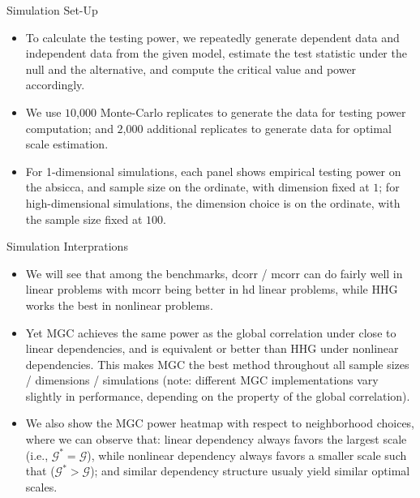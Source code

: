 \documentclass{beamer}
\newcommand{\G}{\mathcal{G}}
\begin{document}
\begin{frame}{Simulation Set-Up}
\begin{itemize}[<+->]
\item To calculate the testing power, we repeatedly generate dependent data and independent data from the given model, estimate the test statistic under the null and the alternative, and compute the critical value and power accordingly.
\item We use $10$,$000$ Monte-Carlo replicates to generate the data for testing power computation; and $2$,$000$ additional replicates to generate data for optimal scale estimation.
\item For 1-dimensional simulations, each panel shows empirical testing power on the absicca, and sample size on the ordinate, with dimension fixed at $1$; for high-dimensional simulations, the dimension choice is on the ordinate, with the sample size fixed at $100$.
\end{itemize}
\end{frame}

\begin{frame}{Simulation Interprations}
\begin{itemize}[<+->]
\item We will see that among the benchmarks, dcorr / mcorr can do fairly well in linear problems with mcorr being better in hd linear problems, while HHG works the best in nonlinear problems.
\item Yet MGC achieves the same power as the global correlation under close to linear dependencies, and is equivalent or better than HHG under nonlinear dependencies. This makes MGC the best method throughout all sample sizes / dimensions / simulations (note: different MGC implementations vary slightly in performance, depending on the property of the global correlation).
\item We also show the MGC power heatmap with respect to neighborhood choices, where we can observe that: linear dependency always favors the largest scale (i.e., $\G^{*}=\G$), while nonlinear dependency always favors a smaller scale such that ($\G^{*}>\G$); and similar dependency structure usualy yield similar optimal scales.
\end{itemize}
\end{frame}
\end{document}

